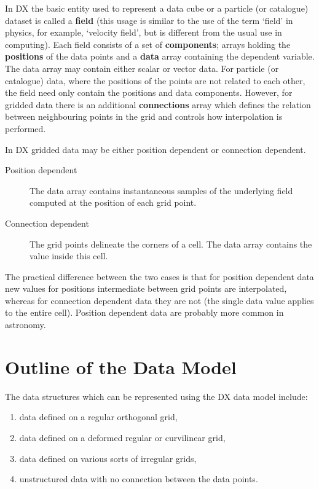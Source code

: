 In DX the basic entity used to represent a data cube or a particle (or
catalogue) dataset is called a {\bf field} (this usage is similar to the
use of the term `field' in physics, for example, `velocity field', but
is different from the usual use in computing). Each field consists of a
set of {\bf components}; arrays holding the {\bf positions} of the data
points and a {\bf data} array containing the dependent variable. The
data array may contain either scalar or vector data. For particle (or
catalogue) data, where the positions of the points are not related to
each other, the field need only contain the positions and data
components. However, for gridded data there is an additional {\bf
connections} array which defines the relation between neighbouring
points in the grid and controls how interpolation is performed.

In DX gridded data may be either position dependent or connection
dependent.

\begin{description}

  \item[Position dependent] The data array contains instantaneous
   samples of the underlying field computed at the position of each
   grid point.

  \item[Connection dependent] The grid points delineate the corners
   of a cell. The data array contains the value inside this cell.

\end{description}

The practical difference between the two cases is that for position
dependent data new values for positions intermediate between grid points
are interpolated, whereas for connection dependent data they are not
(the single data value applies to the entire cell). Position dependent
data are probably more common in astronomy.


\section{\label{OUTLINE}Outline of the Data Model}


The data structures which can be represented using the DX data model
include:

\begin{enumerate}

  \item data defined on a regular orthogonal grid,

  \item data defined on a deformed regular or curvilinear grid,

  \item data defined on various sorts of irregular grids,

  \item unstructured data with no connection between the data points.

\end{enumerate}


